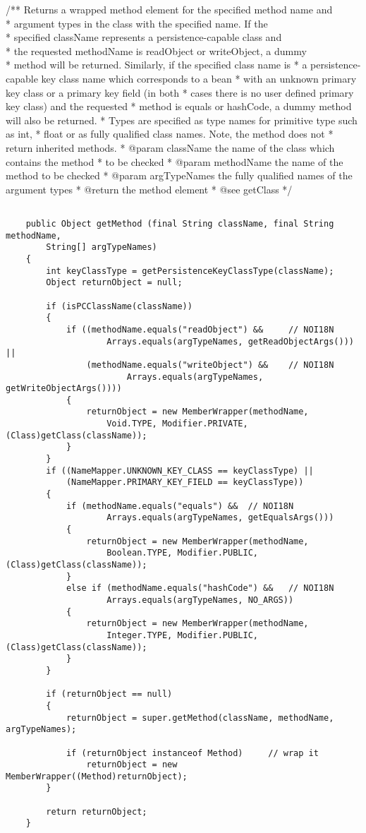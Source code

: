 /** Returns a wrapped method element for the specified method name and \\
	 * argument types in the class with the specified name.  If the \\
	 * specified className represents a persistence-capable class and \\
	 * the requested methodName is readObject or writeObject, a dummy \\
	 * method will be returned.  Similarly, if the specified class name is 
	 * a persistence-capable key class name which corresponds to a bean 
	 * with an unknown primary key class or a primary key field (in both 
	 * cases there is no user defined primary key class) and the requested 
	 * method is equals or hashCode, a dummy method will also be returned.  
	 * Types are specified as type names for primitive type such as int, 
	 * float or as fully qualified class names.  Note, the method does not 
	 * return inherited methods.
	 * @param className the name of the class which contains the method 
	 * to be checked
	 * @param methodName the name of the method to be checked
	 * @param argTypeNames the fully qualified names of the argument types
	 * @return the method element
	 * @see getClass
	 */
\begin{lstlisting}
	
	public Object getMethod (final String className, final String methodName,
		String[] argTypeNames)
	{
		int keyClassType = getPersistenceKeyClassType(className);
		Object returnObject = null;

		if (isPCClassName(className))
		{
			if ((methodName.equals("readObject") && 	// NOI18N
                    Arrays.equals(argTypeNames, getReadObjectArgs())) ||
				(methodName.equals("writeObject") && 	// NOI18N
                        Arrays.equals(argTypeNames, getWriteObjectArgs())))
			{
				returnObject = new MemberWrapper(methodName, 
					Void.TYPE, Modifier.PRIVATE, (Class)getClass(className));
			}
		}
		if ((NameMapper.UNKNOWN_KEY_CLASS == keyClassType) || 
			(NameMapper.PRIMARY_KEY_FIELD == keyClassType))
		{
			if (methodName.equals("equals") && 	// NOI18N
                    Arrays.equals(argTypeNames, getEqualsArgs()))
			{
				returnObject = new MemberWrapper(methodName, 
					Boolean.TYPE, Modifier.PUBLIC, (Class)getClass(className));
			}
			else if (methodName.equals("hashCode") && 	// NOI18N
                    Arrays.equals(argTypeNames, NO_ARGS))
			{
				returnObject = new MemberWrapper(methodName, 
					Integer.TYPE, Modifier.PUBLIC, (Class)getClass(className));
			}
		}

		if (returnObject == null)
		{
			returnObject = super.getMethod(className, methodName, argTypeNames);

			if (returnObject instanceof Method)		// wrap it
				returnObject = new MemberWrapper((Method)returnObject);
		}

		return returnObject;
	}	
\end{lstlisting}

